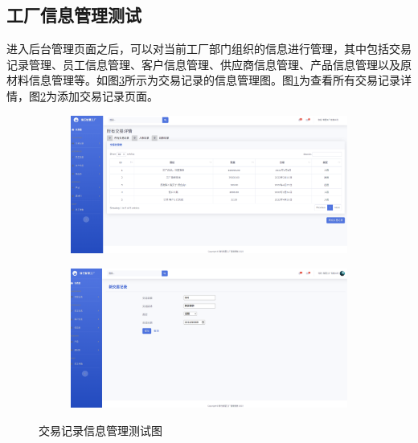 \subsection{工厂信息管理测试}

进入后台管理页面之后，可以对当前工厂部门组织的信息进行管理，其中包括交易记录管理、员工信息管理、客户信息管理、供应商信息管理、产品信息管理以及原材料信息管理等。如图\ref{fig:tscttf}所示为交易记录的信息管理图。图\ref{fig:vuatsc}为查看所有交易记录详情，图\ref{fig:adnutsc}为添加交易记录页面。

\begin{figure}[H]
    \centering
    \begin{subfigure}{.45\textwidth}
        \centering
        \includegraphics[width=\textwidth]{figures/6viewalltransc.png}
        \label{fig:vuatsc}
    \end{subfigure}
    \qquad
    \begin{subfigure}{.45\textwidth}
        \centering
        \includegraphics[width=\textwidth]{figures/6addnewtransc.png}
        \label{fig:adnutsc}
    \end{subfigure}
    \caption{交易记录信息管理测试图}
    \label{fig:tscttf}
\end{figure}

